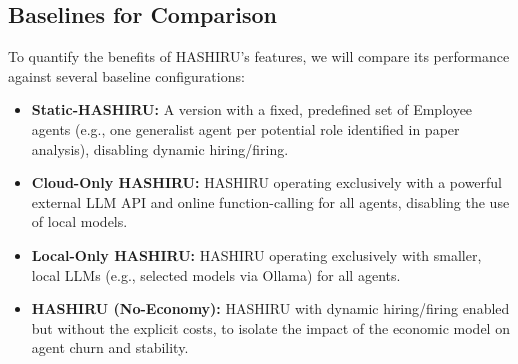 \documentclass[conference]{IEEEtran}
\begin{document}
\subsection{Baselines for Comparison}
\label{subsec:baselines}
To quantify the benefits of HASHIRU's features, we will compare its performance against several baseline configurations:
\begin{itemize}
    \item \textbf{Static-HASHIRU:} A version with a fixed, predefined set of Employee agents (e.g., one generalist agent per potential role identified in paper analysis), disabling dynamic hiring/firing.
    \item \textbf{Cloud-Only HASHIRU:} HASHIRU operating exclusively with a powerful external LLM API and online function-calling for all agents, disabling the use of local models.
    \item \textbf{Local-Only HASHIRU:} HASHIRU operating exclusively with smaller, local LLMs (e.g., selected models via Ollama) for all agents.
    \item \textbf{HASHIRU (No-Economy):} HASHIRU with dynamic hiring/firing enabled but without the explicit costs, to isolate the impact of the economic model on agent churn and stability.
\end{itemize}
\end{document}

